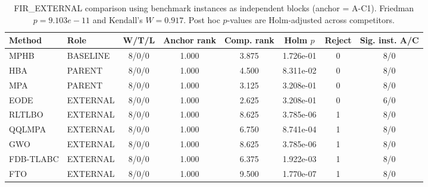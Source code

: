 \begin{table}[!t]
\centering
\footnotesize
\caption{FIR\_EXTERNAL comparison using benchmark instances as independent blocks (anchor = A-C1). Friedman $p=9.103e-11$ and Kendall's $W=0.917$. Post hoc $p$-values are Holm-adjusted across competitors.}
\begin{tabular}{llcccccc}
\hline
Method & Role & W/T/L & Anchor rank & Comp. rank & Holm $p$ & Reject & Sig. inst. A/C \\
\hline
MPHB & BASELINE & 8/0/0 & 1.000 & 3.875 & 1.726e-01 & 0 & 8/0 \\
HBA & PARENT & 8/0/0 & 1.000 & 4.500 & 8.311e-02 & 0 & 8/0 \\
MPA & PARENT & 8/0/0 & 1.000 & 3.125 & 3.208e-01 & 0 & 8/0 \\
EODE & EXTERNAL & 8/0/0 & 1.000 & 2.625 & 3.208e-01 & 0 & 6/0 \\
RLTLBO & EXTERNAL & 8/0/0 & 1.000 & 8.625 & 3.785e-06 & 1 & 8/0 \\
QQLMPA & EXTERNAL & 8/0/0 & 1.000 & 6.750 & 8.741e-04 & 1 & 8/0 \\
GWO & EXTERNAL & 8/0/0 & 1.000 & 8.625 & 3.785e-06 & 1 & 8/0 \\
FDB-TLABC & EXTERNAL & 8/0/0 & 1.000 & 6.375 & 1.922e-03 & 1 & 8/0 \\
FTO & EXTERNAL & 8/0/0 & 1.000 & 9.500 & 1.770e-07 & 1 & 8/0 \\
\hline
\end{tabular}
\end{table}
